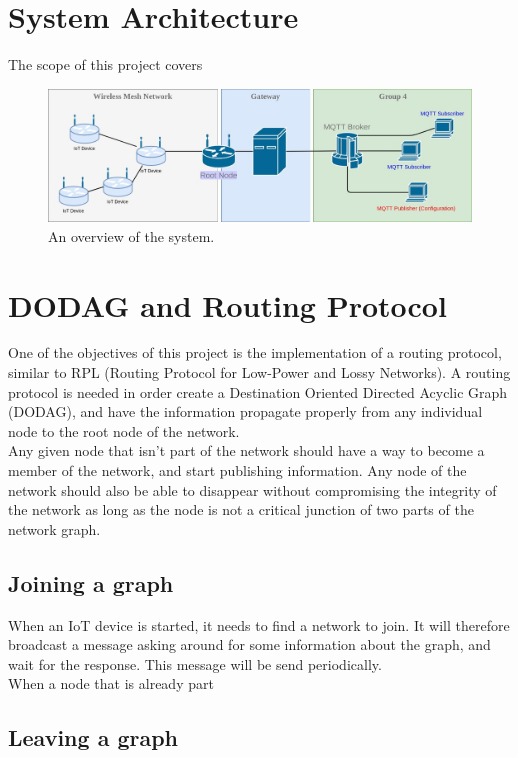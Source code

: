 \documentclass[a4paper,11pt]{article}
\begin{document}
\section{System Architecture}
The scope of this project covers 

\begin{figure}
  \includegraphics[width=\linewidth]{img/network-diagram-1.jpg}
  \caption{An overview of the system.}
  \label{fig:network1}
\end{figure}
\section{DODAG and Routing Protocol}
One of the objectives of this project is the implementation of a routing protocol, similar to RPL (Routing Protocol for Low-Power and Lossy Networks). A routing protocol is needed in order create a Destination Oriented Directed Acyclic Graph (DODAG), and have the information propagate properly from any individual node to the root node of the network.\\

Any given node that isn't part of the network should have a way to become a member of the network, and start publishing information. Any node of the network should also be able to disappear without compromising the integrity of the network as long as the node is not a critical junction of two parts of the network graph.

\subsection{Joining a graph}
When an IoT device is started, it needs to find a network to join. It will therefore broadcast a message asking around for some information about the graph, and wait for the response. This message will be send periodically.\\

When a node that is already part

\subsection{Leaving a graph}
\end{document}

